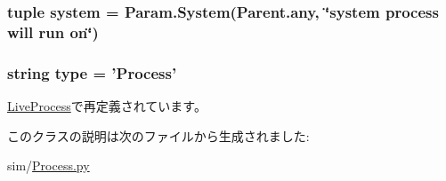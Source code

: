 \label{classProcess_1_1Process_acf316e258896197f4e917a6547e49532}
\hypertarget{classProcess_1_1Process_ab737471139f5a296e5b26e8a0e1b0744}{
\subsubsection[{system}]{\setlength{\rightskip}{0pt plus 5cm}tuple {\bf system} = Param.System(Parent.any, \char`\"{}system process will run on\char`\"{})}}
\label{classProcess_1_1Process_ab737471139f5a296e5b26e8a0e1b0744}
\hypertarget{classProcess_1_1Process_acce15679d830831b0bbe8ebc2a60b2ca}{
\subsubsection[{type}]{\setlength{\rightskip}{0pt plus 5cm}string {\bf type} = '{\bf Process}'}}
\label{classProcess_1_1Process_acce15679d830831b0bbe8ebc2a60b2ca}


\hyperlink{classProcess_1_1LiveProcess_acce15679d830831b0bbe8ebc2a60b2ca}{LiveProcess}で再定義されています。

このクラスの説明は次のファイルから生成されました:\begin{DoxyCompactItemize}
\item 
sim/\hyperlink{Process_8py}{Process.py}\end{DoxyCompactItemize}
